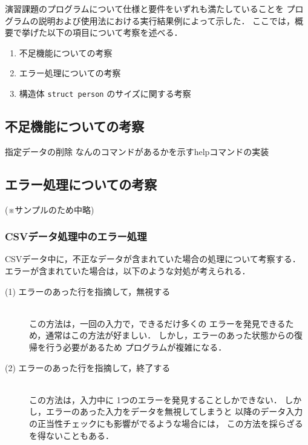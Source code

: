 \documentclass[a4j,11pt]{jarticle}
\begin{document}

演習課題のプログラムについて仕様と要件をいずれも満たしていることを
プログラムの説明および使用法における実行結果例によって示した．
ここでは，概要で挙げた以下の項目について考察を述べる．

\begin{enumerate}
\setlength{\parskip}{2pt} \setlength{\itemsep}{2pt}
    \item 不足機能についての考察
    \item エラー処理についての考察
    \item 構造体 \verb|struct person| のサイズに関する考察
\end{enumerate}

\subsection{不足機能についての考察}

指定データの削除
なんのコマンドがあるかを示すhelpコマンドの実装

\subsection{エラー処理についての考察}

(※サンプルのため中略)

\subsubsection{CSVデータ処理中のエラー処理}

CSVデータ中に，不正なデータが含まれていた場合の処理について考察する．
エラーが含まれていた場合は，以下のような対処が考えられる．

\begin{description} %
  \item[(1) エラーのあった行を指摘して，無視する]~\\
    この方法は，一回の入力で，できるだけ多くの
    エラーを発見できるため，通常はこの方法が好ましい．
    しかし，エラーのあった状態からの復帰を行う必要があるため
    プログラムが複雑になる．
  \item[(2) エラーのあった行を指摘して，終了する]~\\
    この方法は，入力中に 1つのエラーを発見することしかできない．
    しかし，エラーのあった入力をデータを無視してしまうと
    以降のデータ入力の正当性チェックにも影響がでるような場合には，
    この方法を採らざるを得ないこともある．
\end{description}
\end{document}
